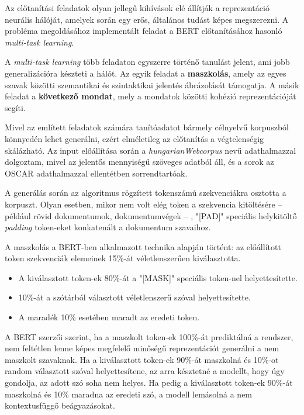 Az előtanítási feladatok olyan jellegű kihívások elé állítják a reprezentáció neurális hálóját, amelyek során egy erős, általános tudást képes megszerezni. A probléma megoldásához implementált feladat a BERT előtanításához hasonló \textit{multi-task learning}. 

A \textit{multi-task learning} több feladaton egyszerre történő tanulást jelent, ami jobb generalizációra készteti a hálót. Az egyik feladat a \textbf{maszkolás}, amely az egyes szavak közötti szemantikai és szintaktikai jelentés ábrázolását támogatja. A másik feladat a \textbf{következő mondat}, mely a mondatok közötti kohézió reprezentációját segíti.

Mivel az említett feladatok számára tanítóadatot bármely célnyelvű korpuszból könnyedén lehet generálni, ezért elméletileg az előtanítás a végtelenségig skálázható. Az input előállítása során a \textit{hungarianWebcorpus} nevű adathalmazzal dolgoztam, mivel az jelentős mennyiségű szöveges adatból áll, és a sorok az OSCAR adathalmazzal ellentétben sorrendtartóak.

A generálás során az algoritmus rögzített tokenszámú szekvenciákra osztotta a korpuszt. Olyan esetben, mikor nem volt elég token a szekvencia kitöltésére – például rövid dokumentumok, dokumentumvégek – , "[PAD]" speciális helykitöltő \textit{padding} token-eket konkatenált a dokumentum szavaihoz. 
 
A maszkolás a BERT-ben alkalmazott technika alapján történt: az előállított token szekvenciák elemeinek 15\%-át véletlenszerűen kiválasztotta. 
\begin{itemize}
	\item A kiválasztott token-ek 80\%-át a "[MASK]" speciális token-nel helyettesítette. 
	\item 10\%-át a szótárból választott véletlenszerű szóval helyettesítette.
	\item A maradék 10\% esetében maradt az eredeti token.
\end{itemize}

A BERT szerzői szerint, ha a maszkolt token-ek 100\%-át prediktálná a rendszer, nem feltétlen lenne képes megfelelő minőségű reprezentációt generálni a nem maszkolt szavaknak. Ha a kiválasztott token-ek 90\%-át maszkolná és 10\%-ot random választott szóval helyettesítene, az arra késztetné a modellt, hogy úgy gondolja, az adott szó soha nem helyes. Ha pedig a kiválasztott token-ek 90\%-át maszkolná és 10\% maradna az eredeti szó, a modell lemásolná a nem kontextusfüggő beágyazásokat.

